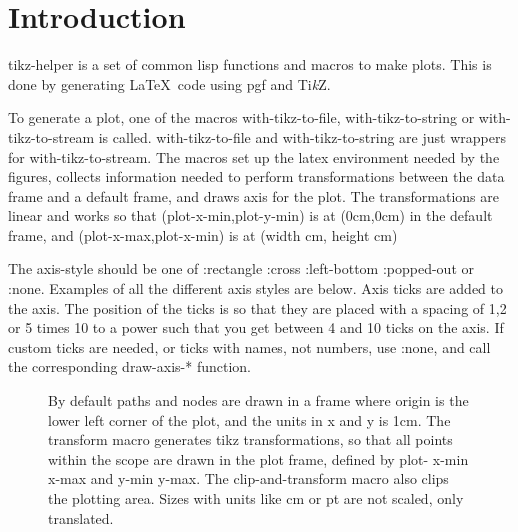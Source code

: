 \documentclass{article}
\begin{document}
\section{Introduction}
tikz-helper is a set of common lisp functions and macros to make plots. This is done by 
generating \LaTeX \ code using pgf and {Ti\textit{k}Z}.

To generate a plot, one of the macros with-tikz-to-file, with-tikz-to-string or with-tikz-to-stream is called.
with-tikz-to-file and with-tikz-to-string are just wrappers for with-tikz-to-stream.
The macros set up the latex environment needed by the figures, collects information needed to perform 
transformations between the data frame and a default frame, and draws axis for the plot. The transformations are
linear and works so that (plot-x-min,plot-y-min) is at (0cm,0cm) in the default frame, and  (plot-x-max,plot-x-min) is at (width cm, height cm)

The axis-style should be one of :rectangle :cross :left-bottom :popped-out or :none.
Examples of all the different axis styles are below. Axis ticks are added to the axis. The position of the ticks is so
that they are placed with a spacing of 1,2 or 5 times 10 to a power such that you get between 4 and 10 ticks on the 
axis. If custom ticks are needed, or ticks with names, not numbers, use :none, and call the corresponding draw-axis-*
function.

\begin{figure}[H]
\centering

\captionsetup{singlelinecheck=off}
\caption[asdf]{By default paths and nodes are drawn in a frame where origin is the lower left corner of the plot,
and the units in x and y is 1cm. The transform macro generates tikz transformations, so that all points
within the scope are drawn in the plot frame, defined by plot- x-min x-max and y-min y-max.
 The clip-and-transform macro also clips the plotting area. Sizes with units like cm or pt are not scaled, 
only translated.}
\end{figure}
\end{document}
